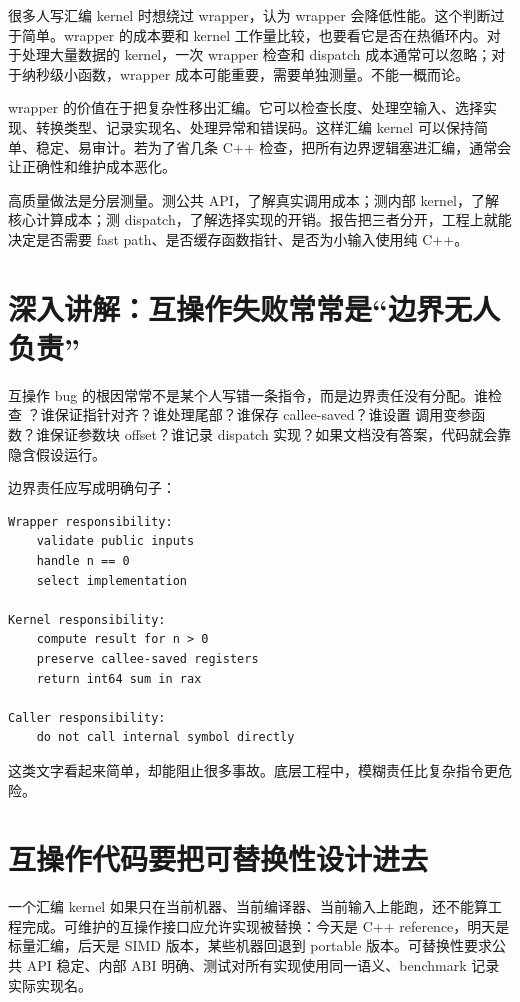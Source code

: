很多人写汇编 kernel 时想绕过 wrapper，认为 wrapper 会降低性能。这个判断过于简单。wrapper 的成本要和 kernel 工作量比较，也要看它是否在热循环内。对于处理大量数据的 kernel，一次 wrapper 检查和 dispatch 成本通常可以忽略；对于纳秒级小函数，wrapper 成本可能重要，需要单独测量。不能一概而论。

wrapper 的价值在于把复杂性移出汇编。它可以检查长度、处理空输入、选择实现、转换类型、记录实现名、处理异常和错误码。这样汇编 kernel 可以保持简单、稳定、易审计。若为了省几条 C++ 检查，把所有边界逻辑塞进汇编，通常会让正确性和维护成本恶化。

高质量做法是分层测量。测公共 API，了解真实调用成本；测内部 kernel，了解核心计算成本；测 dispatch，了解选择实现的开销。报告把三者分开，工程上就能决定是否需要 fast path、是否缓存函数指针、是否为小输入使用纯 C++。

\section{深入讲解：互操作失败常常是“边界无人负责”}

互操作 bug 的根因常常不是某个人写错一条指令，而是边界责任没有分配。谁检查 ？谁保证指针对齐？谁处理尾部？谁保存 callee-saved？谁设置  调用变参函数？谁保证参数块 offset？谁记录 dispatch 实现？如果文档没有答案，代码就会靠隐含假设运行。

边界责任应写成明确句子：

\begin{lstlisting}
Wrapper responsibility:
    validate public inputs
    handle n == 0
    select implementation

Kernel responsibility:
    compute result for n > 0
    preserve callee-saved registers
    return int64 sum in rax

Caller responsibility:
    do not call internal symbol directly
\end{lstlisting}

这类文字看起来简单，却能阻止很多事故。底层工程中，模糊责任比复杂指令更危险。

\section{互操作代码要把可替换性设计进去}

一个汇编 kernel 如果只在当前机器、当前编译器、当前输入上能跑，还不能算工程完成。可维护的互操作接口应允许实现被替换：今天是 C++ reference，明天是标量汇编，后天是 SIMD 版本，某些机器回退到 portable 版本。可替换性要求公共 API 稳定、内部 ABI 明确、测试对所有实现使用同一语义、benchmark 记录实际实现名。

